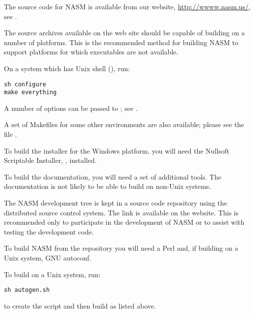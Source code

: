 %
%

The source code for NASM is available from our website,
\href{http://www.nasm.us/}{http://wwww.nasm.us/},
see .


The source archives available on the web site should be capable of
building on a number of platforms.  This is the recommended method for
building NASM to support platforms for which executables are not
available.

On a system which has Unix shell (), run:

\begin{lstlisting}
sh configure
make everything
\end{lstlisting}

A number of options can be passed to ; see
.

A set of Makefiles for some other environments are also available;
please see the file .

To build the installer for the Windows platform, you will need the
Nullsoft Scriptable Installer, , installed.

To build the documentation, you will need a set of additional tools.
The documentation is not likely to be able to build on non-Unix
systems.


The NASM development tree is kept in a source code repository using
the  distributed source control system.  The link is available
on the website.  This is recommended only to participate in the
development of NASM or to assist with testing the development code.

To build NASM from the  repository you will need a Perl and, if
building on a Unix system, GNU autoconf.

To build on a Unix system, run:

\begin{lstlisting}
sh autogen.sh
\end{lstlisting}

to create the  script and then build as listed above.
